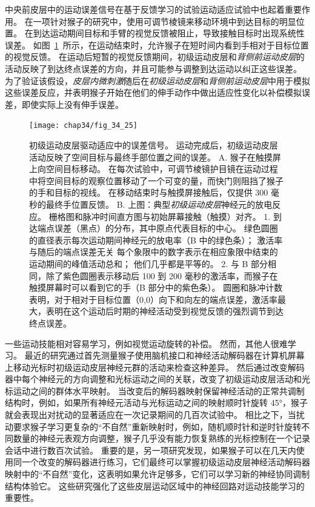 中央前皮层中的运动误差信号在基于反馈学习的试验运动适应试验中也起着重要作用。
在一项针对猴子的研究中，使用可调节棱镜来移动环境中到达目标的明显位置。
在到达运动期间目标和手臂的视觉反馈被阻止，导致接触目标时出现系统性误差。
如图~\ref{fig:34_25}~所示，在运动结束时，允许猴子在短时间内看到手相对于目标位置的视觉反馈。
在运动后短暂的视觉反馈期间，初级运动皮层和\textit{背侧前运动皮层}的活动反映了到达终点误差的方向，并且可能参与调整到达运动以纠正这些误差。
为了验证该假设，\textit{皮层内微刺激}随后在\textit{初级运动皮层}和\textit{背侧前运动皮层}中用于模拟这些误差反应，并表明猴子开始在他们的伸手动作中做出适应性变化以补偿模拟误差，即使实际上没有伸手误差。


\begin{figure}[htbp]
	\centering
	\texttt{[image: chap34/fig\_34\_25]}
	\caption{初级运动皮层驱动适应中的误差信号。
		运动完成后，初级运动皮层活动反映了空间目标与最终手部位置之间的误差\cite{inoue2016error}。
		A. 猴子在触摸屏上向空间目标移动。
		在每次试验中，可调节棱镜护目镜在运动过程中将空间目标的观察位置移动了一个可变的量，而快门则阻挡了猴子的手和目标的视线。
		在移动结束时与触摸屏接触后，仅提供 300 毫秒的最终手位置反馈。
		B. 上图：典型\textit{初级运动皮层}神经元的放电反应。
		栅格图和脉冲时间直方图与初始屏幕接触（触摸）对齐。
		1. 到达端点误差（黑点）的分布，其中原点代表目标的中心。
		绿色圆圈的直径表示每次运动期间神经元的放电率（B 中的绿色条）；
		激活率与随后的端点误差无关
		 每个象限中的数字表示在相应象限中结束的运动期间的峰值活动总和；
		 他们几乎都是平等的。
		 2. 与 B 部分相同，除了紫色圆圈表示移动后 100 到 200 毫秒的激活率，而猴子在触摸屏幕时可以看到它的手（B 部分中的紫色条）。
		 圆圈和脉冲计数表明，对于相对于目标位置（0,0）向下和向左的端点误差，激活率最大，表明在这个运动后时期的神经活动受到视觉反馈的强烈调节到达终点误差。}
	\label{fig:34_25}
\end{figure}


一些运动技能相对容易学习，例如视觉运动旋转的补偿。
然而，其他人很难学习。
最近的研究通过首先测量猴子使用脑机接口和神经活动解码器在计算机屏幕上移动光标时初级运动皮层神经元群的活动来检查这种差异。
然后通过改变解码器中每个神经元的方向调整和光标运动之间的关联，改变了初级运动皮层活动和光标运动之间的群体水平映射。
当改变后的解码器映射保留神经活动的正常共调制结构时，例如，如果所有神经元活动与光标运动之间的映射顺时针旋转 45°，猴子就会表现出对扰动的显著适应在一次记录期间的几百次试验中。
相比之下，当扰动要求猴子学习更复杂的“不自然”重新映射时，例如，随机顺时针和逆时针旋转不同数量的神经元表观方向调整，猴子几乎没有能力恢复熟练的光标控制在一个记录会话中进行数百次试验。
重要的是，另一项研究发现，如果猴子可以在几天内使用同一个改变的解码器进行练习，它们最终可以掌握初级运动皮层神经活动解码器映射中的“不自然”变化，这表明如果允许足够多，它们可以学习新的神经协同调制结构体验它。
这些研究强化了这些皮层运动区域中的神经回路对运动技能学习的重要性。


